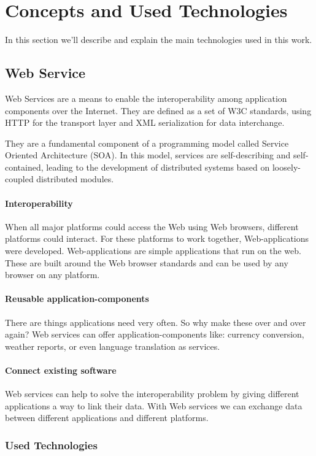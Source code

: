 \section{Concepts and Used Technologies}
In this section we'll describe and explain the main technologies used in this work.

\subsection{Web Service}
Web Services are a means to enable the interoperability among application components over the Internet.  They are defined as a set of W3C standards, using HTTP for the transport layer and XML serialization for data interchange.

They are  a fundamental component of a programming model called Service Oriented Architecture (SOA). In this model, services are self-describing and self-contained, leading to the development of distributed systems based on loosely-coupled distributed modules.

\paragraph{Interoperability}
When all major platforms could access the Web using Web browsers, different platforms could interact. For these platforms to work together, Web-applications were developed. Web-applications are simple applications that run on the web. These are built around the Web browser standards and can be used by any browser on any platform.

\paragraph{Reusable application-components}
There are things applications need very often. So why make these over and over again? Web services can offer application-components like: currency conversion, weather reports, or even language translation as services.

\paragraph{Connect existing software}
Web services can help to solve the interoperability problem by giving different applications a way to link their data. With Web services we can exchange data between different applications and different platforms. \citep{WST}

\subsubsection{Used Technologies}

